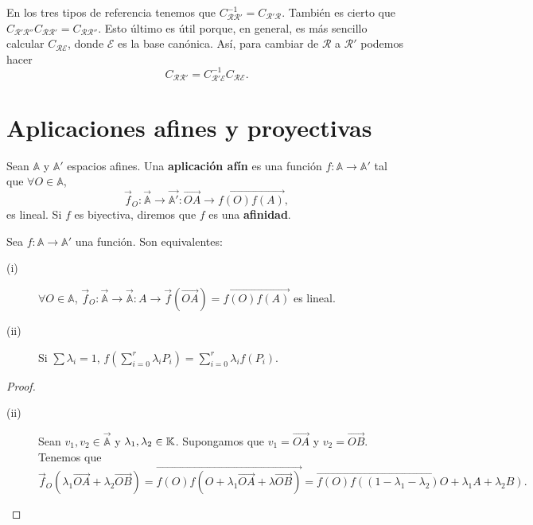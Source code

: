 \begin{observation}
En los tres tipos de referencia tenemos que $\displaystyle C^{-1}_{\mathcal{R}\mathcal{R}'} = C_{\mathcal{R}'\mathcal{R}} $. También es cierto que $\displaystyle C_{\mathcal{R}'\mathcal{R}''} C_{\mathcal{R}\mathcal{R}'} = C_{\mathcal{R}\mathcal{R}''} $. Esto último es útil porque, en general, es más sencillo calcular $\displaystyle C_{\mathcal{R}\mathcal{E}} $, donde $\displaystyle \mathcal{E} $ es la base canónica. Así, para cambiar de $\displaystyle \mathcal{R} $ a $\displaystyle \mathcal{R}' $ podemos hacer
\[C_{\mathcal{R}\mathcal{R}'} = C_{\mathcal{R}'\mathcal{E}}^{-1}C_{\mathcal{R}\mathcal{E}} .\]
\end{observation}
\section{Aplicaciones afines y proyectivas}
\begin{definition}
Sean $\displaystyle \mathbb{A} $ y $\displaystyle \mathbb{A}' $ espacios afines. Una \textbf{aplicación afín} es una función $\displaystyle f : \mathbb{A} \to \mathbb{A}' $ tal que $\displaystyle \forall O \in \mathbb{A} $,
\[\vec{f}_{O} : \vec{\mathbb{A}} \to \vec{\mathbb{A}'} : \overrightarrow{OA} \to \overrightarrow{f\left(O\right)f\left(A\right)} ,\]
es lineal. Si $\displaystyle f $ es biyectiva, diremos que $\displaystyle f $ es una \textbf{afinidad}.
\end{definition}
\begin{prop}
Sea $\displaystyle f : \mathbb{A} \to \mathbb{A}' $ una función. Son equivalentes:
\begin{description}
\item[(i)] $\displaystyle \forall O \in \mathbb{A} $, $\displaystyle \vec{f}_{O} : \vec{\mathbb{A}} \to \vec{\mathbb{A}} : A \to \vec{f}\left(\overrightarrow{OA}\right) = \overrightarrow{f\left(O\right)f\left(A\right)} $ es lineal.
\item[(ii)] Si $\displaystyle \sum \lambda_{i} = 1 $, $\displaystyle f\left(\sum^{r}_{i= 0}\lambda_{i}P_{i}\right) = \sum^{r}_{i= 0}\lambda_{i}f\left(P_{i}\right) $.
\end{description}
\end{prop}
\begin{proof}
\begin{description}
\item[(ii)] Sean $\displaystyle v_{1}, v_{2} \in \vec{\mathbb{A}} $ y $\displaystyle \lambda_{1},\lambda_{2} \in \mathbb{K} $. Supongamos que $\displaystyle v_{1} = \overrightarrow{OA} $ y $\displaystyle v_{2} = \overrightarrow{OB} $. Tenemos que
	\[\vec{f}_{O}\left(\lambda_{1}\overrightarrow{OA} + \lambda_{2}\overrightarrow{OB}\right) = \overrightarrow{f\left(O\right)f\left(O + \lambda_{1}\overrightarrow{OA}+\lambda\overrightarrow{OB}\right)} = \overrightarrow{f\left(O\right)f\left(\left(1-\lambda_{1}-\lambda_{2}\right)O + \lambda_{1}A + \lambda_{2}B\right)} .\]
\end{description}
\end{proof}

